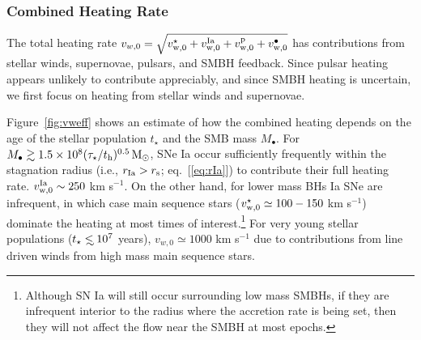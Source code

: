 \documentclass[usenatbib,fleqn]{mn2e}
\newcommand\lsim{\mathrel{\rlap{\lower4pt\hbox{\hskip1pt$\sim$}}
    \raise1pt\hbox{$<$}}}
\newcommand{\Mbh}[1][]{M_{\bullet#1}}
\newcommand{\vwO}{v_{w,0}}
\newcommand{\tage}{t_{\star}}
\begin{document}
\subsubsection{Combined Heating Rate} 

The total heating rate $\vwO = \sqrt{v_{\rm w,0}^{\star} + v_{\rm w,0}^{\rm Ia} + v_{\rm w,0}^{\rm p} + v_{\rm w,0}^{\bullet}}$ has contributions from stellar winds, supernovae, pulsars, and SMBH feedback.  Since pulsar heating appears unlikely to contribute appreciably, and since SMBH heating is uncertain, we first focus on heating from stellar winds and supernovae.  

Figure~\ref{fig:vweff} shows an estimate of how the combined heating depends on the age of the stellar population $\tage$ and the SMB mass $\Mbh$.  For $M_{\bullet} \gtrsim 1.5\times 10^8 (\tau_{\star}/t_{\rm h})^{0.5} \,{\rm M_\odot}$, SNe Ia occur sufficiently frequently within the stagnation radius (i.e., $r_{\rm Ia} > r_{\rm s}$; eq.~[\ref{eq:rIa}]) to contribute their full heating rate.   $v_{\rm w,0}^{\rm Ia} \sim 250$ km s$^{-1}$.  On the other hand, for lower mass BHs Ia SNe are infrequent, in which case main sequence stars ($v_{\rm w,0}^{\star} \simeq 100-150$ km s$^{-1}$) dominate the heating at most times of interest.\footnote{Although SN Ia will still occur surrounding low mass SMBHs, if they are infrequent interior to the radius where the accretion rate is being set, then they will not affect the flow near the SMBH at most epochs.}  For very young stellar populations ($\tage \lsim 10^7$ years), $\vwO\simeq 1000$ km s$^{-1}$ due to contributions from line driven winds from high mass main sequence stars.
\end{document}
